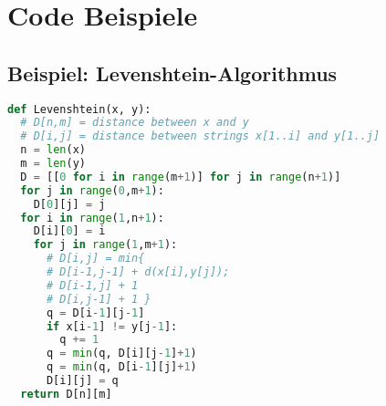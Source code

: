 \documentclass[german]{latex4ei/latex4ei_sheet}
\begin{document}
\newpage

\section{Code Beispiele}

\begin{sectionbox}
\subsection{Beispiel: Levenshtein-Algorithmus}
\begin{lstlisting}[language=Python]
def Levenshtein(x, y):
  # D[n,m] = distance between x and y
  # D[i,j] = distance between strings x[1..i] and y[1..j]
  n = len(x)
  m = len(y)
  D = [[0 for i in range(m+1)] for j in range(n+1)]
  for j in range(0,m+1):
    D[0][j] = j
  for i in range(1,n+1):
    D[i][0] = i
    for j in range(1,m+1):
      # D[i,j] = min{ 
      # D[i-1,j-1] + d(x[i],y[j]);
      # D[i-1,j] + 1
      # D[i,j-1] + 1 }
      q = D[i-1][j-1] 
      if x[i-1] != y[j-1]:
        q += 1
      q = min(q, D[i][j-1]+1)
      q = min(q, D[i-1][j]+1)
      D[i][j] = q
  return D[n][m]
\end{lstlisting}
\end{sectionbox}
\end{document}

